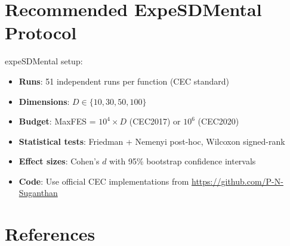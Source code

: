 \documentclass[11pt]{article}
\begin{document}
\section{Recommended ExpeSDMental Protocol}

expeSDMental setup:

\begin{itemize}
    \item \textbf{Runs}: 51 independent runs per function (CEC standard)
    \item \textbf{Dimensions}: $D \in \{10, 30, 50, 100\}$
    \item \textbf{Budget}: MaxFES = $10^4 \times D$ (CEC2017) or $10^6$ (CEC2020)
    \item \textbf{Statistical tests}: Friedman + Nemenyi post-hoc, Wilcoxon signed-rank
    \item \textbf{Effect sizes}: Cohen's $d$ with 95\% bootstrap confidence intervals
    \item \textbf{Code}: Use official CEC implementations from \url{https://github.com/P-N-Suganthan}
\end{itemize}

\section{References}
\end{document}
